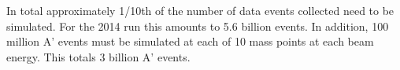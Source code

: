 %
%
In total approximately 1/10th of the number of data events collected need to be simulated. For the 2014 run this amounts to 5.6 billion events.
In addition, 100 million A' events must be simulated at each of 10 mass points at each beam energy. This totals 3 billion A' events.

